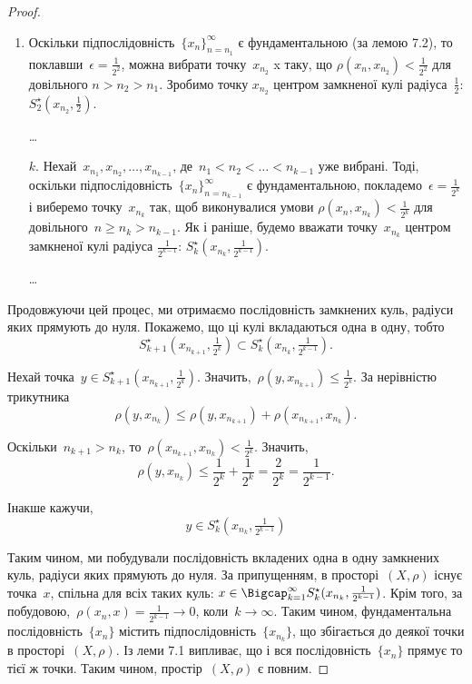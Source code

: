 \begin{proof}
\begin{enumerate}
\item Оскільки підпослідовність~$\{x_n\}_{n = n_1}^\infty$
є фундаментальною (за лемою 7.2), то поклавши~$\epsilon = \frac{1}{2^2}$,
можна вибрати точку~$x_{n_2}$ x таку, що 
$\rho(x_n, x_{n_2}) < \frac{1}{2^2}$ для довільного
$n > n_2 > n_1$. Зробимо точку
$x_{n_2}$ центром замкненої кулі
радіуса~$\frac{1}{2}$: $S_2^\star(x_{n_2}, \frac{1}{2})$.

\dots

\item[$k$.] Нехай~$x_{n_1}, x_{n_2}, \dots, x_{n_{k - 1}}$,
де~$n_1 < n_2 < \dots < n_{k - 1}$ уже вибрані.
Тоді, оскільки підпослідовність~$\{x_n\}_{n = n_{k - 1}}^\infty$
є фундаментальною, покладемо~$\epsilon = \frac{1}{2^k}$ і виберемо
точку~$x_{n_k}$ так, щоб виконувалися умови 
$\rho(x_n, x_{n_k}) < \frac{1}{2^k}$
для довільного~$n \ge n_k > n_{k - 1}$. Як і раніше, будемо
вважати точку~$x_{n_k}$ центром замкненої кулі радіуса
$\frac{1}{2^{k - 1}}$: $S_k^\star(x_{n_k}, \frac{1}{2^{k - 1}})$.

\dots
\end{enumerate}

Продовжуючи цей процес, ми отримаємо послідовність
замкнених куль, радіуси яких прямують до нуля. Покажемо,
що ці кулі вкладаються одна в одну, тобто
\begin{equation*}
    S_{k + 1}^\star ( x_{n_{k + 1}}, \tfrac{1}{2^k} ) \subset
    S_k^\star ( x_{n_k}, \tfrac{1}{2^{k - 1}} ).
\end{equation*}

Нехай точка~$y \in S_{k + 1}^\star ( x_{n_{k + 1}}, \tfrac{1}{2^k} )$.
Значить,~$\rho(y, x_{n_{k + 1}}) \le \frac{1}{2^k}$.
За нерівністю трикутника
\begin{equation*}
    \rho(y, x_{n_k}) \le \rho(y, x_{n_{k + 1}}) + \rho(x_{n_{k + 1}}, x_{n_k}).
\end{equation*}

Оскільки~$n_{k + 1} > n_k$, то~$\rho(x_{n_{k + 1}}, x_{n_k}) < \frac{1}{2^k}$. Значить,
\begin{equation*}
    \rho(y, x_{n_k}) \le \frac{1}{2^k} + \frac{1}{2^k} =
    \frac{2}{2^k} = \frac{1}{2^{k - 1}}.
\end{equation*}

Інакше кажучи,
\begin{equation*}
    y \in S_k^\star ( x_{n_k}, \tfrac{1}{2^{k - 1}} )
\end{equation*}

Таким чином, ми побудували послідовність вкладених одна
в одну замкнених куль, радіуси яких прямують до нуля.
За припущенням, в просторі~$(X, \rho)$ існує точка~$x$,
спільна для всіх таких куль:
$x \in \Bigcap_{k = 1}^\infty S_k^\star(x_{n_k}, \frac{1}{2^{k - 1}})$. 
Крім того, за побудовою,~$\rho(x_n, x) = \frac{1}{2^{k - 1}} \to 0$,
коли~$k \to \infty$. Таким чином,
фундаментальна послідовність~$\{x_n\}$ містить
підпослідовність~$\{x_{n_k}\}$, що збігається до деякої точки в
просторі~$(X, \rho)$. Із леми 7.1 випливає, що і вся
послідовність~$\{x_n\}$ прямує то тієї ж точки. Таким чином,
простір~$(X, \rho)$ є повним.
\end{proof}

